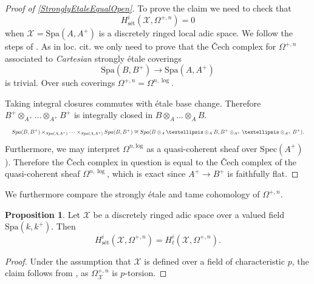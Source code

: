 \documentclass{amsart}
\def\Spa{\textrm{Spa}}
\def\Spec{\textrm{Spec}}
\theoremstyle{definition}
\newtheorem{proposition}[theorem]{Proposition}
\newcommand\llog{\mathrm{log}}
\numberwithin{equation}{section}
\begin{document}
\begin{proof}[Proof of \cref{StronglyEtaleEqualOpen}]
	To prove the claim we need to check that 
	\[
	H^i_{\textrm{s\'et}}(\mathcal{X},\Omega^{+,n})=0
	\]
	when $\mathcal{X}=\Spa(A,A^+)$ is a discretely ringed local adic space. We follow the steps of \cite[Proposition 12.3]{HTame}. As in loc. cit. we only need to prove that the \v{C}ech complex for $\Omega^{+,n}$ associated to \textit{Cartesian} strongly \'etale coverings 
	\[
	\Spa(B,B^+)\to \Spa(A,A^+)
	\]
	is trivial. Over such coverings $\Omega^{+,n}=\Omega^{n,\log}$.
	
	 Taking integral closures commutes with \'etale base change. Therefore $B^+\otimes_{A^+}\dots\otimes_{A^+}B^+$ is integrally closed in $B\otimes_A\dots\otimes_AB$.
 \[\resizebox{\columnwidth}{!}{$
 \Spa(B,B^+)\times_{\Spa(A,A^+)} \cdots \times_{\Spa(A,A^+)}\Spa(B,B^+)\cong \Spa(B\otimes_A\dots\otimes_AB, B^+\otimes_{A^+}\dots\otimes_{A^+}B^+).$}
 \]  
 	Furthermore, we may interpret $\Omega^{n,\llog}$ as a quasi-coherent sheaf over $\Spec(A^+)$   \cite[Chapter IV, Corollary 1.2.8]{Ogus}). Therefore the \v{C}ech complex in question is equal to the \v{C}ech complex of the quasi-coherent sheaf $\Omega^{n,\log}$, which is exact since $A^+\to B^+$ is faithfully flat.
\end{proof}
We furthermore compare the strongly \'etale and tame cohomology of $\Omega^{+,n}$.
\begin{proposition}\label{TameEqualStronglyEtale}
	Let $\mathcal{X}$ be a discretely ringed adic space over a valued field $\Spa(k,k^+)$. Then 
	\[
	H^i_{\textrm{s\'et}}(\mathcal{X},\Omega^{+,n})=H^i_t(\mathcal{X},\Omega^{+,n}).
	\]
\end{proposition}
\begin{proof}
	Under the assumption that $\mathcal{X}$ is defined over a field of characteristic $p$, the claim follows from \cite[Proposition 8.5]{HTame}, as $\Omega^{+,n}_\mathcal{X}$ is $p$-torsion. 
\end{proof}
\end{document}
